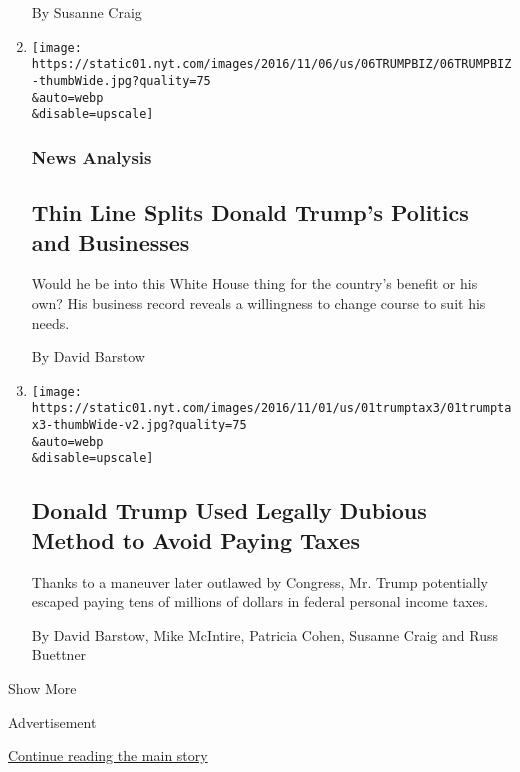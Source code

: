 \begin{enumerate}
  By Susanne Craig
\item
  \href{/2016/11/06/us/politics/donald-trump-business-tax-records.html}{}

  \texttt{[image: https://static01.nyt.com/images/2016/11/06/us/06TRUMPBIZ/06TRUMPBIZ-thumbWide.jpg?quality=75\\\&auto=webp\\\&disable=upscale]}

  \hypertarget{news-analysis}{%
  \subsubsection{News Analysis}\label{news-analysis}}

  \hypertarget{thin-line-splits-donald-trumps-politics-and-businesses}{%
  \subsection{Thin Line Splits Donald Trump's Politics and
  Businesses}\label{thin-line-splits-donald-trumps-politics-and-businesses}}

  Would he be into this White House thing for the country's benefit or
  his own? His business record reveals a willingness to change course to
  suit his needs.

  By David Barstow
\item
  \href{/2016/11/01/us/politics/donald-trump-tax.html}{}

  \texttt{[image: https://static01.nyt.com/images/2016/11/01/us/01trumptax3/01trumptax3-thumbWide-v2.jpg?quality=75\\\&auto=webp\\\&disable=upscale]}

  \hypertarget{donald-trump-used-legally-dubious-method-to-avoid-paying-taxes}{%
  \subsection{Donald Trump Used Legally Dubious Method to Avoid Paying
  Taxes}\label{donald-trump-used-legally-dubious-method-to-avoid-paying-taxes}}

  Thanks to a maneuver later outlawed by Congress, Mr. Trump potentially
  escaped paying tens of millions of dollars in federal personal income
  taxes.

  By David Barstow, Mike McIntire, Patricia Cohen, Susanne Craig and
  Russ Buettner
\end{enumerate}

Show More

Advertisement

\protect\hyperlink{after-mid2}{Continue reading the main story}

